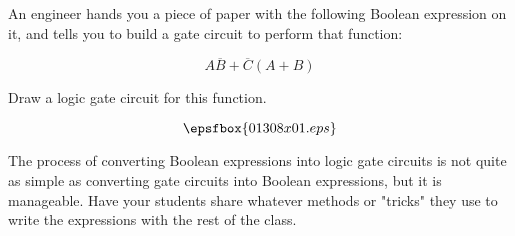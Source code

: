 

An engineer hands you a piece of paper with the following Boolean expression on it, and tells you to build a gate circuit to perform that function:

$$A\overline{B} + \overline{C}(A + B)$$

Draw a logic gate circuit for this function.







$$\epsfbox{01308x01.eps}$$







The process of converting Boolean expressions into logic gate circuits is not quite as simple as converting gate circuits into Boolean expressions, but it is manageable.  Have your students share whatever methods or "tricks" they use to write the expressions with the rest of the class.




